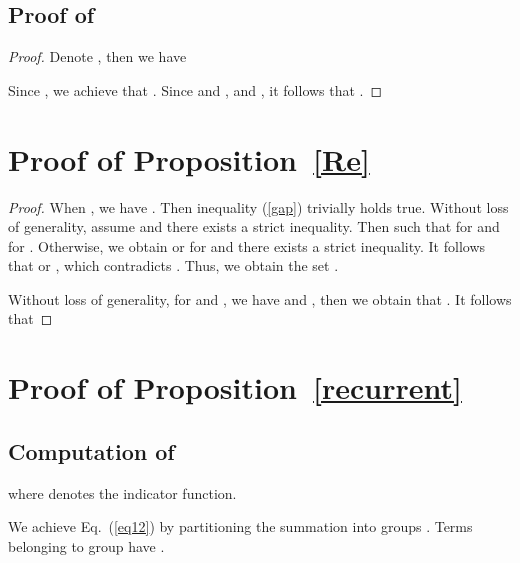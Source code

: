 \documentclass{article} \usepackage{iclr2019_conference,times}
\begin{document}
\subsection{Proof of }

\begin{proof}
Denote , then we have 

Since ,  we achieve that .
Since  and , and , it follows that .

\end{proof}

\section{Proof of Proposition~\ref{Re}}\label{proof_re} 

\begin{proof}




When , we have . Then inequality (\ref{gap}) trivially holds true.
Without loss of generality, assume  and there exists a strict inequality.  Then  such that  for  and  for   . Otherwise, we obtain    or   for  and there exists a strict inequality. It follows that     or  , which  contradicts  .  Thus, we obtain the set  .


Without loss of generality, 
for  and  , we  have  and , then we obtain that . It follows that 

















\end{proof}



\section{Proof of Proposition~\ref{recurrent}}\label{proof_recurrent}

\subsection{Computation of }


where  denotes the indicator function.

We achieve Eq.~(\ref{eq12}) by partitioning the summation into  groups . Terms belonging to group  have .
\end{document}
